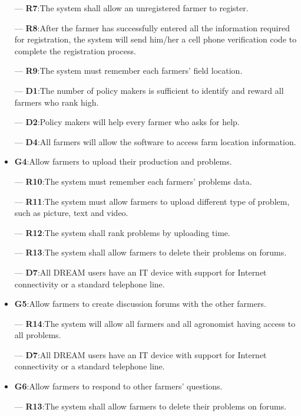\documentclass[../../main.tex]{subfiles}
\begin{document}
\begin{itemize}
		    ---\textbf{ R7}:The system shall allow an unregistered farmer to register.
		    
		    ---\textbf{ R8}:After the farmer has successfully entered all the information required for registration, the system will send him/her a cell phone verification code to complete the registration process.
		    
		    ---\textbf{ R9}:The system must remember each farmers' field location.
		    
    		---\textbf{ D1}:The number of policy makers is sufficient to identify and reward all farmers who rank high.
    		
    		---\textbf{ D2}:Policy makers will help every farmer who asks for help.
    		
    		---\textbf{ D4}:All farmers will allow the software to access farm location information.
		
		
		\item \textbf{G4}:Allow farmers to upload their production and problems.
		
		    ---\textbf{ R10}:The system must remember each farmers' problems data.
		    
		    ---\textbf{ R11}:The system must allow farmers to upload different type of problem, such as picture, text and video.
		    
		    ---\textbf{ R12}:The system shall rank problems by uploading time.
		    
		    ---\textbf{ R13}:The system shall allow farmers to delete their problems on forums.
		    
		    ---\textbf{ D7}:All DREAM users have an IT device with support for Internet connectivity or a standard telephone line.
		
		
		\item \textbf{G5}:Allow farmers to create discussion forums with the other farmers.
		
            ---\textbf{ R14}:The system will allow all farmers and all agronomist having access to all problems.
		    
		    ---\textbf{ D7}:All DREAM users have an IT device with support for Internet connectivity or a standard telephone line.
		
		
		\item \textbf{G6}:Allow farmers to respond to other farmers’ questions.
		
		    ---\textbf{ R13}:The system shall allow farmers to delete their problems on forums.
		    

\end{itemize}
\end{document}
